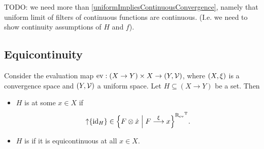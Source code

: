 TODO: we need more than \ref{uniformImpliesContinuousConvergence}, namely that uniform limit of filters of continuous functions are continuous. (I.e. we need to show continuity assumptions of $H$ and $f$).

\subsection{Equicontinuity}
\begin{definition}
Consider the evaluation map $\evalMap: (X\to Y)\times X \to \sSet{Y,\mathcal{V}}$, where $\sSet{X, \xi}$ is a convergence space and $\sSet{Y, \mathcal{V}}$ a uniform space. Let $H\subseteq (X\to Y)$ be a set. Then
\begin{itemize}
\item $H$ is  at some $x\in X$ if
\[ \upset\{\id_H\} \in \setbuilder{F\otimes \pfilter{x}}{F\overset{\xi}{\longrightarrow}x}^{\uRelEv^\transp}. \]
\item $H$ is  if it is equicontinuous at all $x\in X$.
\end{itemize}
\end{definition}

